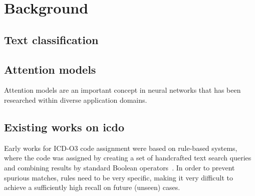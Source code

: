 \chapter{Background}
\label{ch:background}

\section{Text classification}

\section{Attention models}
Attention models are an important concept in neural networks that has
been researched within diverse application domains.

\section{Existing works on \ac{icdo}}
Early works for ICD-O3 code assignment were based on rule-based
systems, where the code was assigned by creating a set of handcrafted
text search queries and combining results by standard Boolean
operators~\cite{crocetti_automatic_2004}. In order to prevent spurious
matches, rules need to be very specific, making it very difficult to
achieve a sufficiently high recall on future (unseen) cases.

